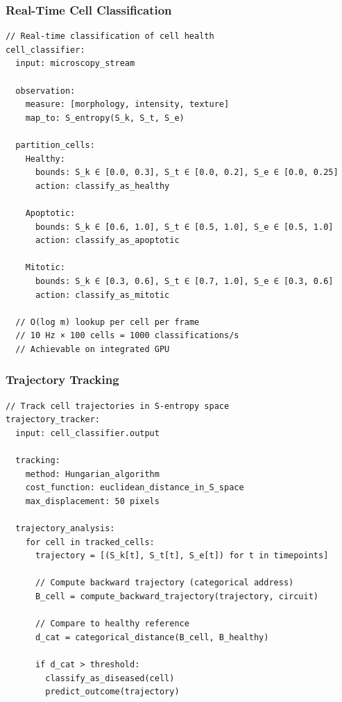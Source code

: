 \documentclass[12pt,a4paper]{article}
\begin{document}
\subsubsection{Real-Time Cell Classification}

\begin{lstlisting}[basicstyle=\ttfamily\small]
// Real-time classification of cell health
cell_classifier:
  input: microscopy_stream
  
  observation:
    measure: [morphology, intensity, texture]
    map_to: S_entropy(S_k, S_t, S_e)
  
  partition_cells:
    Healthy:
      bounds: S_k ∈ [0.0, 0.3], S_t ∈ [0.0, 0.2], S_e ∈ [0.0, 0.25]
      action: classify_as_healthy
    
    Apoptotic:
      bounds: S_k ∈ [0.6, 1.0], S_t ∈ [0.5, 1.0], S_e ∈ [0.5, 1.0]
      action: classify_as_apoptotic
    
    Mitotic:
      bounds: S_k ∈ [0.3, 0.6], S_t ∈ [0.7, 1.0], S_e ∈ [0.3, 0.6]
      action: classify_as_mitotic
  
  // O(log m) lookup per cell per frame
  // 10 Hz × 100 cells = 1000 classifications/s
  // Achievable on integrated GPU
\end{lstlisting}

\subsubsection{Trajectory Tracking}

\begin{lstlisting}[basicstyle=\ttfamily\small]
// Track cell trajectories in S-entropy space
trajectory_tracker:
  input: cell_classifier.output
  
  tracking:
    method: Hungarian_algorithm
    cost_function: euclidean_distance_in_S_space
    max_displacement: 50 pixels
  
  trajectory_analysis:
    for cell in tracked_cells:
      trajectory = [(S_k[t], S_t[t], S_e[t]) for t in timepoints]
      
      // Compute backward trajectory (categorical address)
      B_cell = compute_backward_trajectory(trajectory, circuit)
      
      // Compare to healthy reference
      d_cat = categorical_distance(B_cell, B_healthy)
      
      if d_cat > threshold:
        classify_as_diseased(cell)
        predict_outcome(trajectory)
\end{lstlisting}
\end{document}
